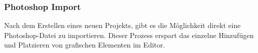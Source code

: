 




\subsubsection{Photoshop Import}

Nach dem Erstellen eines neuen Projekts, gibt es die Möglichkeit direkt eine Photoshop-Datei zu importieren. Dieser Prozess erspart das einzelne Hinzufügen und Platzieren von grafischen Elementen im Editor. %

